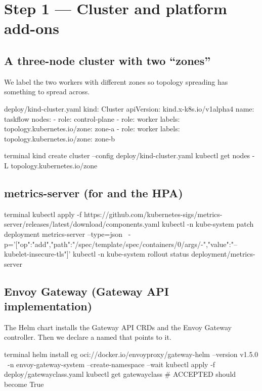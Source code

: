 \section{Step 1 --- Cluster and platform add-ons}

\subsection{A three-node cluster with two ``zones''}

We label the two workers with different zones so topology spreading has
something to spread across.

\begin{yamlcode}{deploy/kind-cluster.yaml}
kind: Cluster
apiVersion: kind.x-k8s.io/v1alpha4
name: taskflow
nodes:
  - role: control-plane
  - role: worker
    labels:
      topology.kubernetes.io/zone: zone-a
  - role: worker
    labels:
      topology.kubernetes.io/zone: zone-b
\end{yamlcode}

\begin{bashcode}{terminal}
kind create cluster --config deploy/kind-cluster.yaml
kubectl get nodes -L topology.kubernetes.io/zone
\end{bashcode}

\subsection{metrics-server (for  and the HPA)}

\begin{bashcode}{terminal}
kubectl apply -f https://github.com/kubernetes-sigs/metrics-server/releases/latest/download/components.yaml
kubectl -n kube-system patch deployment metrics-server --type=json \
  -p='[{"op":"add","path":"/spec/template/spec/containers/0/args/-","value":"--kubelet-insecure-tls"}]'
kubectl -n kube-system rollout status deployment/metrics-server
\end{bashcode}

\subsection{Envoy Gateway (Gateway API implementation)}

The Helm chart installs the Gateway API CRDs and the Envoy Gateway controller.
Then we declare a \kc{GatewayClass} named \kc{eg} that points to it.

\begin{bashcode}{terminal}
helm install eg oci://docker.io/envoyproxy/gateway-helm --version v1.5.0 \
  -n envoy-gateway-system --create-namespace --wait
kubectl apply -f deploy/gatewayclass.yaml
kubectl get gatewayclass          # ACCEPTED should become True
\end{bashcode}

